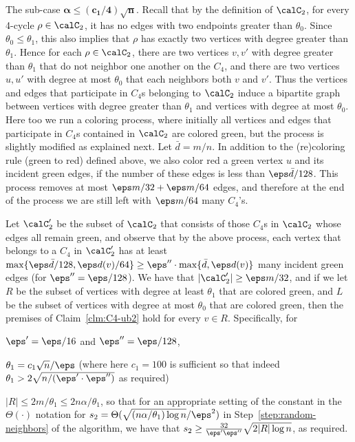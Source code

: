 \documentclass{article}
\begin{document}
\smallskip\noindent
\textsf{The sub-case $\mathbf{\alpha\leq (c_1/4)\sqrt n}$.}
Recall that by the definition of $\calC_2$, for every 4-cycle  $\rho\in \calC_2$, it has no edges with two endpoints greater than $\theta_0$. Since $\theta_0\leq \theta_1$, this also implies that $\rho$ has exactly two vertices with degree greater than $\theta_1$. 
Hence for each $\rho\in \calC_2$, there are two vertices $v,v'$ with degree greater than $\theta_1$ that do not neighbor one another on the $C_4$, and there are two vertices $u,u'$ with degree at most $\theta_0$ that each neighbors both $v$ and $v'$. Thus the vertices and edges that participate in $C_4$s belonging to $\calC_2$ induce a bipartite graph between vertices with degree greater than $\theta_1$ and vertices with degree at most $\theta_0$. Here too we run a coloring process, where initially all vertices and edges that participate in $C_4$s contained in $\calC_2$ are colored green, but the process is slightly modified as explained next. Let $\bar{d} = m/n$.  In addition to the (re)coloring rule (green to red) defined above,
we also color red a green vertex $u$ and its incident green edges, if the number of these edges is less than 
$\eps\bar{d}/128$. This process removes at most $\eps m/32+\eps m/64$ edges, and therefore at the end of the process we are still left with $\eps m/64$ many $C_4$'s.

Let $\calC_2'$  be the subset of  $\calC_2$ that consists of those $C_4$s in $\calC_2$ whose edges all remain green, and observe that by the above process, each vertex that belongs to a $C_4$ in $\calC_2'$ has at least $\max\{\eps \bar{d}/128,\eps d(v)/64\}\geq \eps''\cdot \max\{\bar{d},\eps d(v)\}$ many incident green edges (for $\eps''=\eps/128$). 
We have that $|\calC'_2| \geq \eps m/32$, and if we let $R$ be the subset of vertices with degree at least $\theta_1$ that are colored green, and $L$ be the subset of vertices with degree at most $\theta_0$ that are colored green, then the premises of Claim~\ref{clm:C4-ub2} hold for every $v\in R$.
Specifically, for
\begin{inparaenum}[(1)]
    \item $\eps'=\eps/16$ and $\eps''=\eps/128$,
    \item $\theta_1=c_1\sqrt n/\eps$ (where here $c_1 = 100$ is sufficient so that indeed $\theta_1>2\sqrt{n/(\eps'\cdot \eps'')}$ as required)
    \item $|R|\leq 2m/\theta_1\leq 2n\alpha/\theta_1 $,
    so that for an appropriate setting of the constant in the $\Theta(\cdot)$ notation for $s_2=\Theta(\sqrt{  (n\alpha/\theta_1)\log n}/\eps^2)$ in Step~\ref{step:random-neighbors} of the algorithm, we have that
    $s_2 \geq \frac{32}{\eps' \eps''}\sqrt{2|R|\log n}$, as required. 
\end{inparaenum}
\end{document}
